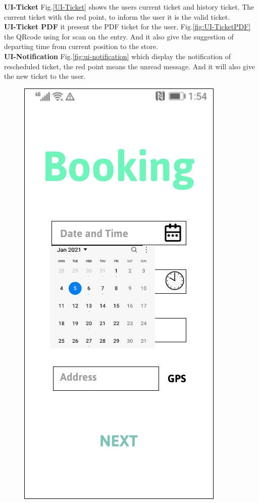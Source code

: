 \documentclass[a4paper,12pt]{report}
\begin{document}
\textbf{UI-Ticket}  Fig.\ref{UI-Ticket} shows the users current ticket and history ticket. The current ticket with the red point, to inform the user it is the valid ticket.~\\

\textbf{UI-Ticket PDF} it present the PDF ticket for the user, Fig.\ref{fig:UI-TicketPDF} the QRcode using for scan on the entry. And it also give the suggestion of departing time from current position to the store.~\\
 
\textbf{UI-Notification}  Fig.\ref{fig:ui-notification} which display the notification of rescheduled ticket, the red point means the unread message. And it will also give the new ticket to the user.



\begin{figure}[H]
	\begin{minipage}[t]{0.56\linewidth}
		\centering
		\includegraphics[scale=0.5]{UI-Date.png}

\end{minipage}
\end{figure}
\end{document}
